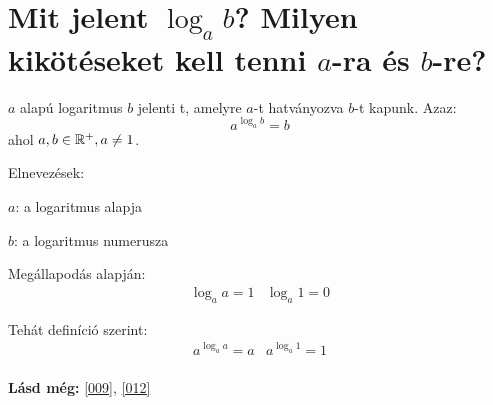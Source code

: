 
\section{Mit jelent \texorpdfstring{$\log_{a}b$}{log\textunderscore{}a(b)}? 
Milyen kikötéseket kell tenni \texorpdfstring{$a$}{a}-ra és
\texorpdfstring{$b$}{b}-re?}
\label{016}

\begin{defin}[Logaritmus]
\label{def:log}
$a$ alapú logaritmus $b$ jelenti t, amelyre $a$-t
hatványozva $b$-t kapunk. Azaz:
\[
  a^{\log_{a}b} = b
\]
ahol $a, b \in \mathbb{R}^+, a \neq 1$.

Elnevezések:

$a$: a logaritmus alapja

$b$: a logaritmus numerusza
\end{defin}

Megállapodás alapján:
\[
  \begin{array}{lr}
    \log_{a}a = 1 & \log_{a}1 = 0
  \end{array}
\]

Tehát definíció szerint:
\[
  \begin{array}{lr}
    a^{\log_{a}a} = a & a^{\log_{a}1} = 1\\
  \end{array}
\]

\textbf{Lásd még:} \ref{009}, \ref{012}
